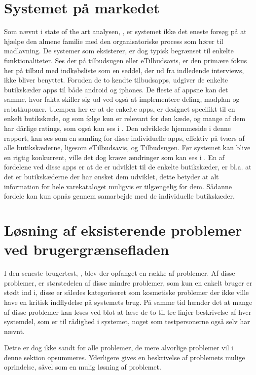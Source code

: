 \section{Systemet på markedet}
Som nævnt i state of the art analysen, , er systemet ikke det eneste forsøg på at hjælpe den almene familie med den organisatoriske process som hører til madlavning.
De systemer som eksisterer, er dog typisk begrænset til enkelte funktionaliteter.
Ses der på tilbudsugen eller eTilbudsavis, er den primære fokus her på tilbud med indkøbsliste som en seddel, der ud fra indledende interviews, ikke bliver benyttet.
Foruden de to kendte tilbudsapps, udgiver de enkelte butikskæder apps til både android og iphones.
De fleste af appsne kan det samme, hvor fakta skiller sig ud ved også at implementere deling, madplan og rabatkuponer.
Ulempen her er at de enkelte apps, er designet specifikt til en enkelt butikskæde, og som følge kun er relevant for den kæde, og mange af dem har dårlige ratings, som også kan ses i .
Den udviklede hjemmeside i denne rapport, kan ses som en samling for disse individuelle apps, effektiv på tværs af alle butikskæderne, ligesom eTilbudsavis, og Tilbudsugen.
Før systemet kan blive en rigtig konkurrent, ville det dog kræve ændringer som kan ses i .
En af fordelene ved disse apps er at de er udviklet til de enkelte butikskæder, er bl.a. at det er butikskæderne der har ønsket dem udviklet, dette betyder at alt information for hele varekataloget muligvis er tilgængelig for dem.
Sådanne fordele kan kun opnås gennem samarbejde med de individuelle butikskæder.

\section{Løsning af eksisterende problemer ved brugergrænsefladen}
I den seneste brugertest, , blev der opfanget en række af problemer.
Af disse problemer, er størstedelen af disse mindre problemer, som kun en enkelt bruger er stødt ind i, disse er således kategoriseret som kosmetiske problemer der ikke ville have en kritisk indflydelse på systemets brug.
På samme tid hænder det at mange af disse problemer kan løses ved blot at læse de to til tre linjer beskrivelse af hver systemdel, som er til rådighed i systemet, noget som testpersonerne også selv har nævnt.

Dette er dog ikke sandt for alle problemer, de mere alvorlige problemer vil i denne sektion opsummeres.
Yderligere gives en beskrivelse af problemets mulige oprindelse, såvel som en mulig løsning af problemet.

